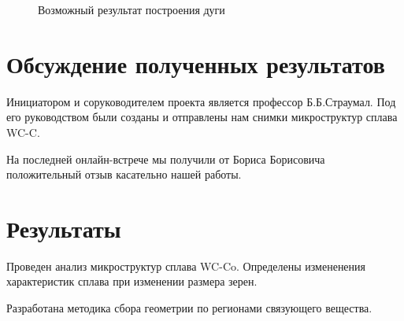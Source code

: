 \documentclass[a4paper, 14pt]{article}
\begin{document}
	\begin{figure}[h]
		\caption{Возможный результат построения дуги}
		\label{arc}
	\end{figure}
	
	
	\section{Обсуждение полученных результатов }
	
	Инициатором и соруководителем проекта является профессор Б.Б.Страумал. Под его руководством были созданы и отправлены нам снимки микроструктур сплава WC-C.
	
	На последней онлайн-встрече мы получили от Бориса Борисовича положительный отзыв касательно нашей работы.
	
	
	\section{Результаты}
	
	Проведен анализ микроструктур сплава  WC-Co. Определены измененения  характеристик сплава при изменении размера зерен. 
	
	Разработана методика сбора геометрии по регионами связующего вещества.
	
	

	
\end{document}
